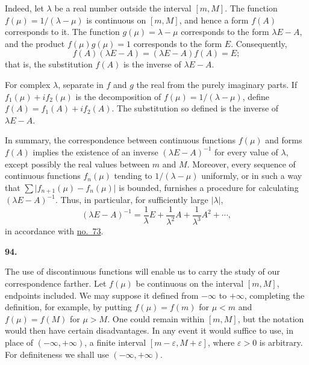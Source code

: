 \documentclass[
  paper=b5,
  fontsize=13pt,
  twoside=true,
  open=any,
  bookmarkpackage=false,
  chapterprefix=true,
  headings=normal
]{scrbook}
\theoremstyle{definition}
\newcommand{\numberedparagraph}[1]{%
  \par\medskip\phantomsection\label{sec:#1}%
  \noindent\textbf{#1.}\enspace
}
\begin{document}
Indeed, let \(\lambda\) be a real number outside the interval \([m,M]\).  The
function \(f(\mu)=1/(\lambda-\mu)\) is continuous on \([m,M]\), and hence a form
\(f(A)\) corresponds to it.  The function \(g(\mu)=\lambda-\mu\) corresponds to
the form \(\lambda E-A\), and the product \(f(\mu)g(\mu)=1\) corresponds to the
form \(E\).  Consequently,
\[
  f(A)(\lambda E-A)=(\lambda E-A)f(A)=E;
\]
that is, the substitution \(f(A)\) is the inverse of \(\lambda E-A\).

For complex \(\lambda\), separate in \(f\) and \(g\) the real from the purely
imaginary parts.  If \(f_1(\mu)+if_2(\mu)\) is the decomposition of
\(f(\mu)=1/(\lambda-\mu)\), define
\(f(A)=f_1(A)+if_2(A)\).  The substitution so defined is the inverse of
\(\lambda E-A\).

In summary, the correspondence between continuous functions \(f(\mu)\) and
forms \(f(A)\) implies the existence of an inverse \((\lambda E-A)^{-1}\) for
every value of \(\lambda\), except possibly the real values between \(m\) and
\(M\).  Moreover, every sequence of continuous functions \(f_n(\mu)\) tending
to \(1/(\lambda-\mu)\) uniformly, or in such a way that
\(\sum\lvert f_{n+1}(\mu)-f_n(\mu)\rvert\) is bounded, furnishes a procedure for
calculating \((\lambda E-A)^{-1}\).  Thus, in particular, for sufficiently large
\(\lvert\lambda\rvert\),
\[
  (\lambda E-A)^{-1}=\frac1\lambda E+\frac1{\lambda^2}A+
  \frac1{\lambda^3}A^2+\cdots,
\]
in accordance with \hyperref[sec:73]{no.~73}.

\numberedparagraph{94}
The use of discontinuous functions will enable us to carry the study of our
correspondence farther.  Let \(f(\mu)\)
be continuous on the interval \([m,M]\), endpoints included.  We may suppose it
defined from \(-\infty\) to \(+\infty\), completing the definition, for example,
by putting \(f(\mu)=f(m)\) for \(\mu<m\) and \(f(\mu)=f(M)\) for \(\mu>M\).
One could remain within \([m,M]\), but the notation would then have certain
disadvantages.  In any event it would suffice to use, in place of
\(( -\infty,+\infty)\), a finite interval \([m-\varepsilon,M+\varepsilon]\),
where \(\varepsilon>0\) is arbitrary.  For definiteness we shall use
\(( -\infty,+\infty)\).
\end{document}

